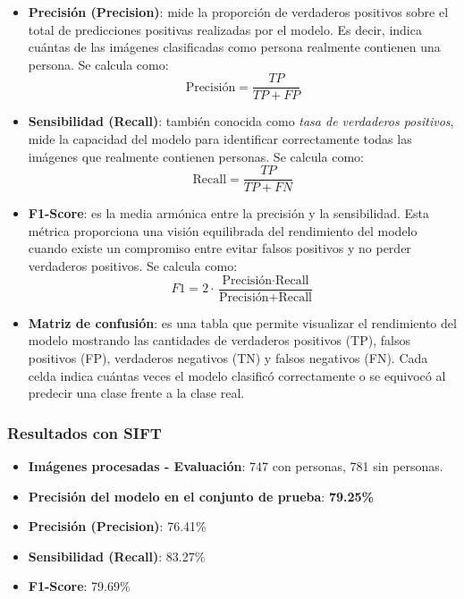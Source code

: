\documentclass[a4paper]{article}
\begin{document}
\begin{itemize}
    \item \textbf{Precisión (Precision)}: mide la proporción de verdaderos positivos sobre el total de predicciones positivas realizadas por el modelo. Es decir, indica cuántas de las imágenes clasificadas como persona realmente contienen una persona. Se calcula como: 
    \[
    \text{Precisión} = \frac{TP}{TP + FP}
    \]

    \item \textbf{Sensibilidad (Recall)}: también conocida como \textit{tasa de verdaderos positivos}, mide la capacidad del modelo para identificar correctamente todas las imágenes que realmente contienen personas. Se calcula como:
    \[
    \text{Recall} = \frac{TP}{TP + FN}
    \]

    \item \textbf{F1-Score}: es la media armónica entre la precisión y la sensibilidad. Esta métrica proporciona una visión equilibrada del rendimiento del modelo cuando existe un compromiso entre evitar falsos positivos y no perder verdaderos positivos. Se calcula como:
    \[
    F1 = 2 \cdot \frac{\text{Precisión} \cdot \text{Recall}}{\text{Precisión} + \text{Recall}}
    \]

    \item \textbf{Matriz de confusión}: es una tabla que permite visualizar el rendimiento del modelo mostrando las cantidades de verdaderos positivos (TP), falsos positivos (FP), verdaderos negativos (TN) y falsos negativos (FN). Cada celda indica cuántas veces el modelo clasificó correctamente o se equivocó al predecir una clase frente a la clase real.
\end{itemize}


\subsubsection*{Resultados con SIFT}

\begin{itemize}
    \item \textbf{Imágenes procesadas - Evaluación}: 747 con personas, 781 sin personas.
    \item \textbf{Precisión del modelo en el conjunto de prueba}: \textbf{79.25\%}
    \item \textbf{Precisión (Precision)}: 76.41\%
    \item \textbf{Sensibilidad (Recall)}: 83.27\%
    \item \textbf{F1-Score}: 79.69\%
\end{itemize}
\end{document}
